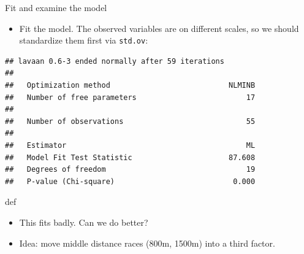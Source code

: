 \documentclass[ignorenonframetext,]{beamer}
\newenvironment{Shaded}{\begin{snugshade}}{\end{snugshade}}
\newcommand{\DataTypeTok}[1]{\textcolor[rgb]{0.13,0.29,0.53}{#1}}
\newcommand{\FloatTok}[1]{\textcolor[rgb]{0.00,0.00,0.81}{#1}}
\newcommand{\KeywordTok}[1]{\textcolor[rgb]{0.13,0.29,0.53}{\textbf{#1}}}
\newcommand{\NormalTok}[1]{#1}
\newcommand{\OperatorTok}[1]{\textcolor[rgb]{0.81,0.36,0.00}{\textbf{#1}}}
\newcommand{\StringTok}[1]{\textcolor[rgb]{0.31,0.60,0.02}{#1}}
\providecommand{\tightlist}{%
  \setlength{\itemsep}{0pt}\setlength{\parskip}{0pt}}
\begin{document}
\begin{frame}[fragile]{Fit and examine the model}
\protect\hypertarget{fit-and-examine-the-model}{}

\begin{itemize}
\tightlist
\item
  Fit the model. The observed variables are on different scales, so we
  should standardize them first via \texttt{std.ov}:
\end{itemize}

\begin{Shaded}
\end{Shaded}

\begin{verbatim}
## lavaan 0.6-3 ended normally after 59 iterations
## 
##   Optimization method                           NLMINB
##   Number of free parameters                         17
## 
##   Number of observations                            55
## 
##   Estimator                                         ML
##   Model Fit Test Statistic                      87.608
##   Degrees of freedom                                19
##   P-value (Chi-square)                           0.000
\end{verbatim}

def

\begin{itemize}
\item
  This fits badly. Can we do better?
\item
  Idea: move middle distance races (800m, 1500m) into a third factor.
\end{itemize}

\end{frame}
\end{document}
